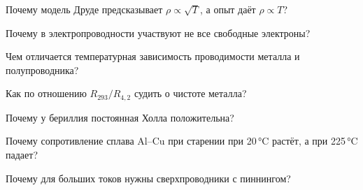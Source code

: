 \begin{proverka}
\item Почему модель Друде предсказывает $\rho\propto\sqrt T$, а опыт даёт
$\rho\propto T$?
\item Почему в электропроводности участвуют не все свободные электроны?
\item Чем отличается температурная зависимость проводимости металла и
полупроводника?
\item Как по отношению $R_{293}/R_{4{,}2}$ судить о чистоте металла?
\item Почему у бериллия постоянная Холла положительна?
\item Почему сопротивление сплава Al--Cu при старении при 20\,°C растёт, а при
225\,°C падает?
\item Почему для больших токов нужны сверхпроводники с пиннингом?
\end{proverka}

